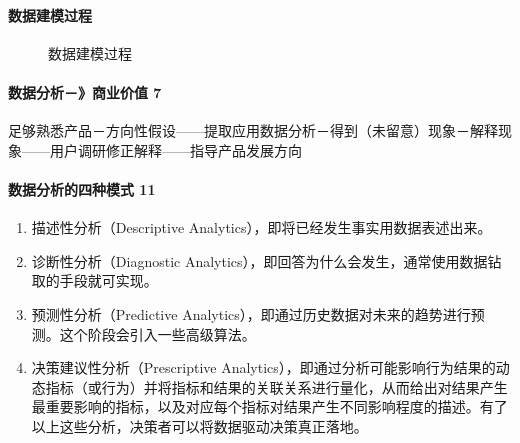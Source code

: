 \documentclass[letterpaper,11pt,english]{sphinxmanual}
\begin{document}
\paragraph{数据建模过程}
\label{\detokenize{chapter_knowledge/data_analysis:id2}}
\begin{figure}[H]
\centering
\capstart

\noindent{}
\caption{数据建模过程}\label{\detokenize{chapter_knowledge/data_analysis:id19}}\end{figure}


\paragraph{数据分析－》商业价值 7\sphinxfootnotemark[573]}
\label{\detokenize{chapter_knowledge/data_analysis:id3}}%
\begin{footnotetext}[573]\sphinxAtStartFootnote
{}
%
\end{footnotetext}\ignorespaces 
足够熟悉产品－方向性假设——提取应用数据分析－得到（未留意）现象－解释现象——用户调研修正解释——指导产品发展方向


\paragraph{数据分析的四种模式 11\sphinxfootnotemark[574]}
\label{\detokenize{chapter_knowledge/data_analysis:id4}}%
\begin{footnotetext}[574]\sphinxAtStartFootnote
{}
%
\end{footnotetext}\ignorespaces \begin{enumerate}
%
\item {} 
描述性分析（Descriptive Analytics），即将已经发生事实用数据表述出来。

\item {} 
诊断性分析（Diagnostic
Analytics），即回答为什么会发生，通常使用数据钻取的手段就可实现。

\item {} 
预测性分析（Predictive
Analytics），即通过历史数据对未来的趋势进行预测。这个阶段会引入一些高级算法。

\item {} 
决策建议性分析（Prescriptive
Analytics），即通过分析可能影响行为结果的动态指标（或行为）并将指标和结果的关联关系进行量化，从而给出对结果产生最重要影响的指标，以及对应每个指标对结果产生不同影响程度的描述。有了以上这些分析，决策者可以将数据驱动决策真正落地。

\end{enumerate}
\end{document}
